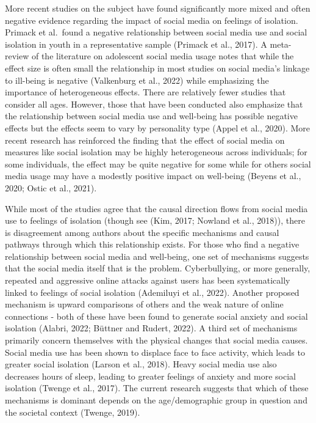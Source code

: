 \documentclass[
  letterpaper,
  DIV=11,
  numbers=noendperiod]{scrartcl}
\begin{document}
More recent studies on the subject have found significantly more mixed
and often negative evidence regarding the impact of social media on
feelings of isolation. Primack et al.~found a negative relationship
between social media use and social isolation in youth in a
representative sample (Primack et al., 2017). A meta-review of the
literature on adolescent social media usage notes that while the effect
size is often small the relationship in most studies on social media's
linkage to ill-being is negative (Valkenburg et al., 2022) while
emphasizing the importance of heterogeneous effects. There are
relatively fewer studies that consider all ages. However, those that
have been conducted also emphasize that the relationship between social
media use and well-being has possible negative effects but the effects
seem to vary by personality type (Appel et al., 2020). More recent
research has reinforced the finding that the effect of social media on
measures like social isolation may be highly heterogeneous across
individuals; for some individuals, the effect may be quite negative for
some while for others social media usage may have a modestly positive
impact on well-being (Beyens et al., 2020; Ostic et al., 2021).

While most of the studies agree that the causal direction flows from
social media use to feelings of isolation (though see (Kim, 2017;
Nowland et al., 2018)), there is disagreement among authors about the
specific mechanisms and causal pathways through which this relationship
exists. For those who find a negative relationship between social media
and well-being, one set of mechanisms suggests that the social media
itself that is the problem. Cyberbullying, or more generally, repeated
and aggressive online attacks against users has been systematically
linked to feelings of social isolation (Ademiluyi et al., 2022). Another
proposed mechanism is upward comparisons of others and the weak nature
of online connections - both of these have been found to generate social
anxiety and social isolation (Alabri, 2022; Büttner and Rudert, 2022). A
third set of mechanisms primarily concern themselves with the physical
changes that social media causes. Social media use has been shown to
displace face to face activity, which leads to greater social isolation
(Larson et al., 2018). Heavy social media use also decreases hours of
sleep, leading to greater feelings of anxiety and more social isolation
(Twenge et al., 2017). The current research suggests that which of these
mechanisms is dominant depends on the age/demographic group in question
and the societal context (Twenge, 2019).
\end{document}
